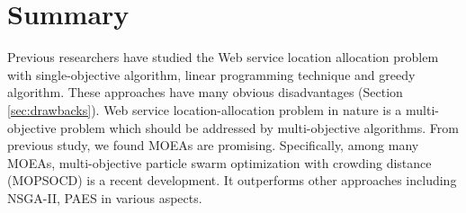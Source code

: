\section{Summary}

Previous researchers have studied the Web service location allocation problem with single-objective algorithm, linear programming technique and 
greedy algorithm. These approaches have many obvious disadvantages (Section \ref{sec:drawbacks}). 
Web service location-allocation problem in nature is a multi-objective problem which should be addressed by multi-objective algorithms. 
From previous study, we found MOEAs are promising. Specifically, among many MOEAs, 
multi-objective particle swarm optimization with crowding distance (MOPSOCD) is a recent development. It outperforms other approaches including NSGA-II, PAES
in various aspects. 
